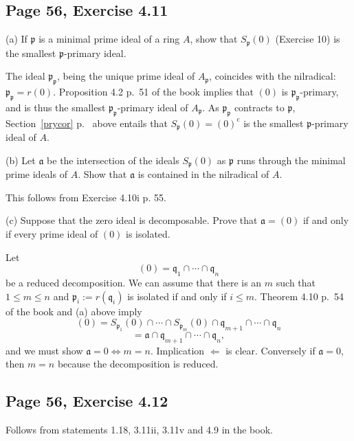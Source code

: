 \documentclass[parskip=half,fontsize=12pt]{scrartcl}%
\newcommand{\oo}{\operatorname}\newcommand{\ooo}{\operatorname*}
\newcommand{\mf}{\mathfrak}
\newcommand{\aaa}{\mf a}
\newcommand{\ppp}{\mf p}
\newcommand{\qqq}{\mf q}
\begin{document}
\subsection{Page 56, Exercise 4.11}\label{411}%

(a) If $\ppp$ is a minimal prime ideal of a ring $A$, show that $S_\ppp(0)$ (Exercise 10) is the smallest $\ppp$-primary ideal.

The ideal $\ppp_\ppp$, being the unique prime ideal of $A_\ppp$, coincides with the nilradical: $\ppp_\ppp=r(0)$. Proposition 4.2 p.~51 of the book implies that $(0)$ is $\ppp_\ppp$-primary, and is thus the smallest $\ppp_\ppp$-primary ideal of $A_\ppp$. As $\ppp_\ppp$ contracts to $\ppp$, Section~\ref{prycor} p.~\pageref{prycor} above entails that $S_\ppp(0)=(0)^{\oo c}$ is the smallest $\ppp$-primary ideal of $A$. %

(b) Let $\aaa$ be the intersection of the ideals $S_\ppp(0)$ as  $\ppp$ runs through the minimal prime ideals of $A$. Show that $\aaa$ is contained in the nilradical of $A$.

This follows from Exercise 4.10i p. 55.

(c) Suppose that the zero ideal is decomposable. Prove that $\aaa=(0)$ if and only if every prime ideal of $(0)$ is isolated.

Let 
$$
(0)=\qqq_1\cap\cdots\cap\qqq_n
$$ 
be a reduced decomposition. We can assume that there is an $m$ such that $1\le m\le n$ and $\ppp_i:=r(\qqq_i)$ is isolated if and only if $i\le m$. Theorem 4.10 p.~54 of the book and (a) above imply  
$$
(0)=S_{\ppp_1}(0)\cap\cdots\cap S_{\ppp_m}(0)\cap\qqq_{m+1}\cap\cdots\cap\qqq_n
$$ 
$$
=\aaa\cap\qqq_{m+1}\cap\cdots\cap\qqq_n,
$$ 
and we must show $\aaa=0\iff m=n$. Implication $\Longleftarrow$ is clear. Conversely if $\aaa=0$, then $m=n$ because the decomposition is reduced.

\subsection{Page 56, Exercise 4.12}%

Follows from statements 1.18, 3.11ii, 3.11v and 4.9 in the book.
\end{document}
